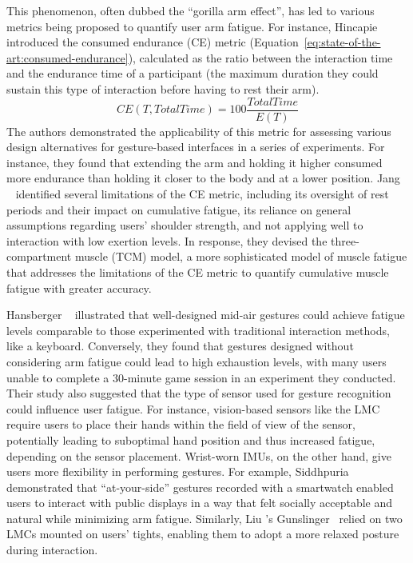 This phenomenon, often dubbed the ``gorilla arm effect'', has led to various metrics being proposed to quantify user arm fatigue. 
For instance, Hincapie \etal~\cite{Hincapie:2014} introduced the consumed endurance (CE) metric (Equation~\ref{eq:state-of-the-art:consumed-endurance}), calculated as the ratio between the interaction time and the endurance time of a participant (\ie the maximum duration they could sustain this type of interaction before having to rest their arm).
% 
\begin{equation}\label{eq:state-of-the-art:consumed-endurance}
    CE(T,TotalTime) = 100\frac{TotalTime}{E(T)}
\end{equation}
%
The authors demonstrated the applicability of this metric for assessing various design alternatives for gesture-based interfaces in a series of experiments.
For instance, they found that extending the arm and holding it higher consumed more endurance than holding it closer to the body and at a lower position. 
%
Jang \etal~\cite{Jang:2017} identified several limitations of the CE metric, including its oversight of rest periods and their impact on cumulative fatigue, its reliance on general assumptions regarding users' shoulder strength, and not applying well to interaction with low exertion levels. In response, they devised the three-compartment muscle (TCM) model, a more sophisticated model of muscle fatigue that addresses the limitations of the CE metric to quantify cumulative muscle fatigue with greater accuracy.

Hansberger \etal~\cite{Hansberger:2017} illustrated that well-designed mid-air gestures could achieve fatigue levels comparable to those experimented with traditional interaction methods, like a keyboard. Conversely, they found that gestures designed without considering arm fatigue could lead to high exhaustion levels, with many users unable to complete a 30-minute game session in an experiment they conducted.
%
Their study also suggested that the type of sensor used for gesture recognition could influence user fatigue. For instance, vision-based sensors like the LMC require users to place their hands within the field of view of the sensor, potentially leading to suboptimal hand position and thus increased fatigue, depending on the sensor placement. 
%
Wrist-worn IMUs, on the other hand, give users more flexibility in performing gestures. For example, Siddhpuria \etal~\cite{Siddhpuria:2017} demonstrated that ``at-your-side'' gestures recorded with a smartwatch enabled users to interact with public displays in a way that felt socially acceptable and natural while minimizing arm fatigue. 
Similarly, Liu \etal's Gunslinger~\cite{Liu:2015} relied on two LMCs mounted on users' tights, enabling them to adopt a more relaxed posture during interaction.



